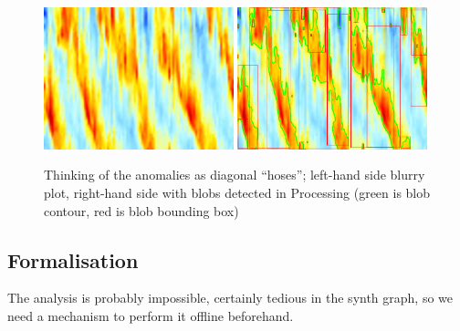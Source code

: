 \documentclass[11pt,a4paper]{article}
\begin{document}
\begin{figure}
\includegraphics[width=0.49\textwidth]{figures/qbo-field-magnified.jpg}%
\hspace{0.02\textwidth}%
\includegraphics[width=0.49\textwidth]{figures/qbo-field-blobs.jpg}
\caption{Thinking of the anomalies as diagonal ``hoses''; left-hand side blurry plot, right-hand side with blobs detected in Processing (green is blob contour, red is blob bounding box)}
\label{fig:qbo-field-blobs}
\end{figure}

\subsection{Formalisation}

The analysis is probably impossible, certainly tedious in the synth graph, so we need a mechanism to perform it offline beforehand.

\end{document}
